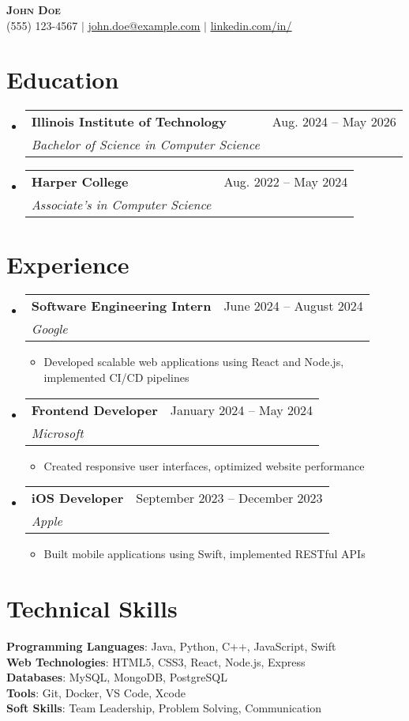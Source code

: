 \documentclass[letterpaper,11pt]{article}
\makeatletter
\newcommand{\resumeItem}[1]{
  \item\small{
    {#1 \vspace{-2pt}}
  }
}
\newcommand{\resumeSubheading}[4]{
  \vspace{-2pt}\item
    \begin{tabular*}{0.97\textwidth}[t]{l@{\extracolsep{\fill}}r}
      \textbf{#1} & #2 \\
      \textit{\small#3} & \textit{\small #4} \\
    \end{tabular*}\vspace{-7pt}
}
\newcommand{\resumeSubHeadingListStart}{\begin{itemize}[leftmargin=0.15in, label={}]}
\newcommand{\resumeSubHeadingListEnd}{\end{itemize}}
\newcommand{\resumeItemListStart}{\begin{itemize}}
\newcommand{\resumeItemListEnd}{\end{itemize}\vspace{-5pt}}
\makeatother
\begin{document}
\begin{center}
    \textbf{\Huge \scshape John Doe} \\ \vspace{1pt}
    \small (555) 123-4567 $|$ \href{mailto:john.doe@example.com}{\underline{john.doe@example.com}} $|$ 
    \href{https://linkedin.com/in/}{\underline{linkedin.com/in/}}
\end{center}

\section{Education}
  \resumeSubHeadingListStart
    \resumeSubheading{Illinois Institute of Technology}{Aug. 2024 -- May 2026}{Bachelor of Science in Computer Science}{}
\resumeSubheading{Harper College}{Aug. 2022 -- May 2024}{Associate's in Computer Science}{}
  \resumeSubHeadingListEnd

\section{Experience}
  \resumeSubHeadingListStart
    \resumeSubheading{Software Engineering Intern}{June 2024 -- August 2024}{Google}{}
                \resumeItemListStart
                \resumeItem{Developed scalable web applications using React and Node.js, implemented CI/CD pipelines}
                \resumeItemListEnd
\resumeSubheading{Frontend Developer}{January 2024 -- May 2024}{Microsoft}{}
                \resumeItemListStart
                \resumeItem{Created responsive user interfaces, optimized website performance}
                \resumeItemListEnd
\resumeSubheading{iOS Developer}{September 2023 -- December 2023}{Apple}{}
                \resumeItemListStart
                \resumeItem{Built mobile applications using Swift, implemented RESTful APIs}
                \resumeItemListEnd
  \resumeSubHeadingListEnd

\section{Technical Skills}
 \begin{itemize}[leftmargin=0.15in, label={}]
    \small{\item{
     \textbf{Programming Languages}{: Java, Python, C++, JavaScript, Swift} \\
\textbf{Web Technologies}{: HTML5, CSS3, React, Node.js, Express} \\
\textbf{Databases}{: MySQL, MongoDB, PostgreSQL} \\
\textbf{Tools}{: Git, Docker, VS Code, Xcode} \\
\textbf{Soft Skills}{: Team Leadership, Problem Solving, Communication} \\
    }}
 \end{itemize}

\end{document}
